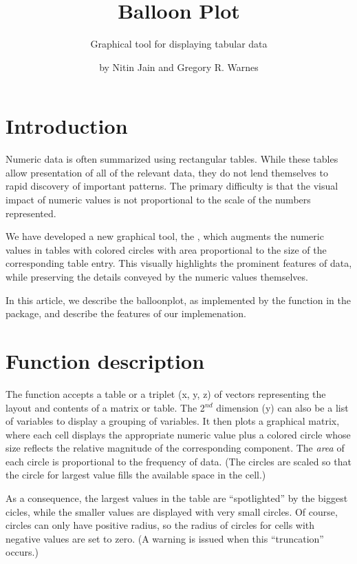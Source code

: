\documentclass[a4paper]{report}
\begin{document}
\begin{article}
\author{by Nitin Jain and Gregory R. Warnes}
\title{Balloon Plot}
\subtitle{Graphical tool for displaying tabular data}

\maketitle

\section*{Introduction}

Numeric data is often summarized using rectangular tables. While
these tables allow presentation of all of the relevant data, they do
not lend themselves to rapid discovery of important patterns. The
primary difficulty is that the visual impact of numeric values is
not proportional to the scale of the numbers represented.

We have developed a new graphical tool, the ,
which augments the numeric values in tables with colored circles
with area proportional to the size of the corresponding table
entry. This visually highlights the prominent features of
data, while preserving the details conveyed by the numeric values
themselves.

In this article, we describe the balloonplot, as
implemented by the  function in the
 package, and describe the features of our
implemenation.


\section*{Function description}

The function  accepts a table or a triplet (x, y,
z) of vectors representing the layout and contents of a matrix or
table. The 2$^{nd}$ dimension (y) can also be a list of variables to
display a grouping of variables. It then plots a graphical matrix,
where each cell displays the appropriate numeric value plus a
colored circle whose size reflects the relative magnitude of the
corresponding component. The
\emph{area} of each circle is proportional to the frequency of
data. (The circles are scaled so that the circle for largest value
fills the available space in the cell.)

As a consequence, the largest values in the table are ``spotlighted''
by the biggest cicles, while the smaller values are displayed
with very small circles.  Of course, circles can only have positive
radius, so the radius of circles for cells with negative values are
set to zero.  (A warning is issued when this ``truncation'' occurs.)


\end{article}
\end{document}
